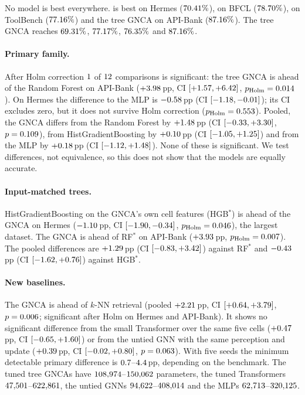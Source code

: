 \documentclass[10pt,twocolumn,letterpaper]{article}
\begin{document}
No model is best everywhere. \numRHerBest{} is best on Hermes ($70.41\%$), \numRBfclBest{} on BFCL ($78.70\%$), \numRTbBest{} on ToolBench ($77.16\%$) and the tree GNCA on API-Bank ($87.16\%$). The tree GNCA reaches $69.31\%$, $77.17\%$, $76.35\%$ and $87.16\%$.

\paragraph{Primary family.} After Holm correction $1$ of $12$ comparisons is significant: the tree GNCA is ahead of the Random Forest on API-Bank ($+3.98$\,pp, CI $[+1.57, +6.42]$, $p_{\text{Holm}}=0.014$). On Hermes the difference to the MLP is $-0.58$\,pp (CI $[-1.18, -0.01]$); its CI excludes zero, but it does not survive Holm correction ($p_{\text{Holm}}=0.553$). Pooled, the GNCA differs from the Random Forest by $+1.48$\,pp (CI $[-0.33, +3.30]$, $p=0.109$), from HistGradientBoosting by $+0.10$\,pp (CI $[-1.05, +1.25]$) and from the MLP by $+0.18$\,pp (CI $[-1.12, +1.48]$). None of these is significant. We test differences, not equivalence, so this does not show that the models are equally accurate.

\paragraph{Input-matched trees.} HistGradientBoosting on the GNCA's own cell features (HGB$^\ast$) is ahead of the GNCA on Hermes ($-1.10$\,pp, CI $[-1.90, -0.34]$, $p_{\text{Holm}}=0.046$), the largest dataset. The GNCA is ahead of RF$^\ast$ on API-Bank ($+3.93$\,pp, $p_{\text{Holm}}=0.007$). The pooled differences are $+1.29$\,pp (CI $[-0.83, +3.42]$) against RF$^\ast$ and $-0.43$\,pp (CI $[-1.62, +0.76]$) against HGB$^\ast$.

\paragraph{New baselines.} The GNCA is ahead of $k$-NN retrieval (pooled $+2.21$\,pp, CI $[+0.64, +3.79]$, $p=0.006$; significant after Holm on Hermes and API-Bank). It shows no significant difference from the small Transformer over the same five cells ($+0.47$\,pp, CI $[-0.65, +1.60]$) or from the untied GNN with the same perception and update ($+0.39$\,pp, CI $[-0.02, +0.80]$, $p=0.063$). With five seeds the minimum detectable primary difference is $0.7$--$4.4$\,pp, depending on the benchmark. The tuned tree GNCAs have $108{,}974$--$150{,}062$ parameters, the tuned Transformers $47{,}501$--$622{,}861$, the untied GNNs $94{,}622$--$408{,}014$ and the MLPs $62{,}713$--$320{,}125$.
\end{document}
